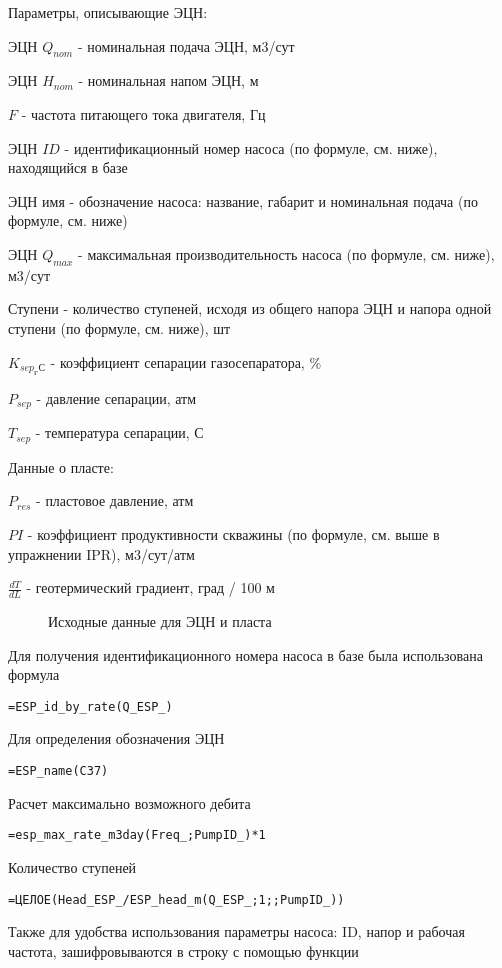 Параметры, описывающие ЭЦН: 

ЭЦН $Q_{nom}$ - номинальная подача ЭЦН, м3/сут

ЭЦН $H_{nom}$ - номинальная напом ЭЦН, м

$F$ - частота питающего тока двигателя, Гц

ЭЦН $ID$ - идентификационный номер насоса (по формуле, см. ниже), находящийся в базе \unf

ЭЦН имя - обозначение насоса: название, габарит и номинальная подача (по формуле, см. ниже)

ЭЦН $Q_{max}$ - максимальная производительность насоса (по формуле, см. ниже), м3/сут

Ступени - количество ступеней, исходя из общего напора ЭЦН и напора одной ступени (по формуле, см. ниже), шт

$K_{sep_ГС}$ - коэффициент сепарации газосепаратора, \%

$P_{sep}$ - давление сепарации, атм

$T_{sep}$ - температура сепарации, С

Данные о пласте:

$P_{res}$ - пластовое давление, атм

$PI$ - коэффициент продуктивности скважины (по формуле, см. выше в упражнении IPR), м3/сут/атм

$\frac{dT}{dL}$ - геотермический градиент, град / 100 м

\begin{figure}[h!]
	\center{\texttt{[image: Ex70\_2]}}
	\caption{Исходные данные для ЭЦН и пласта}
	\label{ris:Ex70_2}
\end{figure}

Для получения идентификационного номера насоса в базе была использована формула

{ \small  \texttt{=ESP\_id\_by\_rate(Q\_ESP\_)}}

Для определения обозначения ЭЦН

{ \small  \texttt{=ESP\_name(C37)}}

Расчет максимально возможного дебита

{ \small  \texttt{=esp\_max\_rate\_m3day(Freq\_;PumpID\_)*1}}

Количество ступеней

{ \small  \texttt{=ЦЕЛОЕ(Head\_ESP\_/ESP\_head\_m(Q\_ESP\_;1;;PumpID\_))
}}

Также для удобства использования параметры насоса: ID, напор и рабочая частота, зашифровываются в строку с помощью функции

